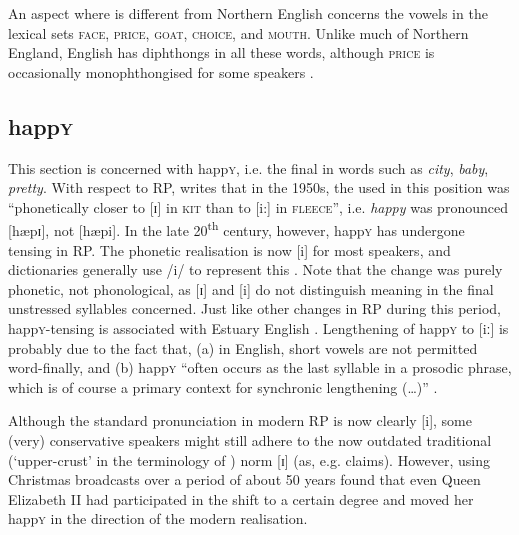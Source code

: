 An aspect where  is different from Northern English concerns the vowels in the lexical sets \textsc{face}, \textsc{price}, \textsc{goat}, \textsc{choice}, and \textsc{mouth}.
Unlike much of Northern England,  English has diphthongs in all these words, although \textsc{price} is occasionally monophthongised for some speakers \citep[cf.][358]{watson2007}.

		\subsection{happ\textsc{y}}\label{sec.var.vow.happy}

This section is concerned with happ\textsc{y}, i.e. the final  in words such as \emph{city}, \emph{baby}, \emph{pretty}.
With respect to RP, \citet[441]{harrington2006} writes that in the 1950s, the  used in this position was ``phonetically closer to [ɪ] in \textsc{kit} than to [i:] in \textsc{fleece}'', i.e. \emph{happy} was pronounced [hæpɪ], not [hæpi].
In the late 20\textsuperscript{th} century, however, happ\textsc{y} has undergone tensing in RP.
The phonetic realisation is now [i] for most speakers, and dictionaries generally use /i/ to represent this .
Note that the change was purely phonetic, not phonological, as [ɪ] and [i] do not distinguish meaning in the final unstressed syllables concerned.
Just like other changes in RP during this period, happ\textsc{y}-tensing is associated with Estuary English \citep[cf.][]{wells1997}.
Lengthening of happ\textsc{y} to [iː] is probably due to the fact that, (a) in English, short vowels are not permitted word-finally, and (b) happ\textsc{y} ``often occurs as the last syllable in a prosodic phrase, which is of course a primary context for synchronic lengthening (\ldots)'' \citep[441]{harrington2006}.

Although the standard pronunciation in modern RP is now clearly [i], some (very) conservative speakers might still adhere to the now outdated traditional (`upper-crust' in the terminology of \citealt{wells1982}) norm [ɪ] (as, e.g. \cite{trudgill1999} claims).
However, using Christmas broadcasts over a period of about 50 years \citet[cf.][452]{harrington2006} found that even Queen Elizabeth II had participated in the shift to a certain degree and moved her happ\textsc{y}  in the direction of the modern realisation.

